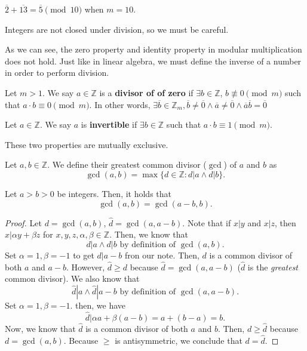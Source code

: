 \documentclass[a4paper]{article}
\begin{document}
\begin{eg}
	\( \overline{2}+\overline{13}=\overline{5} \pmod {10}   \) when \( m=10 \).
\end{eg}

\begin{note}
	Integers are not closed under division, so we must be careful. 
\end{note}

As we can see, the zero property and identity property in modular multiplication does not hold. Just like in linear algebra, we must define the inverse of a number in order to perform division.

\begin{definition}
	Let \( m>1 \). We say \( a\in \mathbb{Z} \) is a \textbf{divisor of of zero} if \( \exists b \in \mathbb{Z} \), \( b \not\equiv 0 \pmod m \) such that \( a \cdot b \equiv 0 \pmod m \). In other words, \( \exists \overline{b}\in \mathbb{Z}_m,\overline{b}\neq \overline{0}\land \overline{a}\neq \overline{0}  \land \overline{a}\overline{b}=\overline{0}       \)
\end{definition}

\begin{definition}
	Let \( a \in \mathbb{Z} \). We say \( a \) is \textbf{invertible} if \( \exists b \in \mathbb{Z} \) such that \( a \cdot b \equiv 1 \pmod m \).
\end{definition}

\begin{note}
	These two properties are mutually exclusive.
\end{note}

\begin{definition}
	Let \( a,b \in \mathbb{Z} \). We define their greatest common divisor (\( \gcd \)) of \( a \) and \( b \) as \[
		\gcd(a,b) = \max\{d \in \mathbb{Z} : d|a \land d|b\}  
	.\] 
\end{definition}

\begin{prop}
	Let \( a>b>0 \) be integers. Then, it holds that \[
		\gcd (a,b) = \gcd (a-b,b)
	.\]
\end{prop}

\begin{proof}
	Let \( d=\gcd(a,b) \), \( \hat{d}=\gcd(a,a-b) \). Note that if \( x|y \) and \( x|z \), then \( x|\alpha y+\beta z \) for \( x,y,z,\alpha ,\beta \in \mathbb{Z} \). Then, we know that \[
		d|a \land d|b \text{ by definition of } \gcd(a,b)
	.\] Set \( \alpha =1,\beta =-1 \) to get \( d|a-b \) fron our note. Then, \( d \) is a common divisor of both \( a \) and \( a-b \). However, \( \hat{d}\ge d \) because \( \hat{d} = \gcd(a,a-b) \) (\( \hat{d} \) is the \emph{greatest} common divisor). We also know that \[
		\hat{d}|a \land \hat{d}|a-b \text{ by definition of } \gcd(a,a-b)
	.\] Set \( \alpha =1,\beta =-1 \). then, we have \[
		\hat{d}|\alpha a+\beta (a-b) = a + (b-a) = b
	.\] Now, we know that \( \hat{d} \) is a common divisor of both \( a \) and \( b \). Then, \( d \ge \hat{d} \) because \( d=\gcd(a,b) \). Because \( \ge   \) is antisymmetric, we conclude that \( d=\hat{d} \).
\end{proof}
\end{document}
